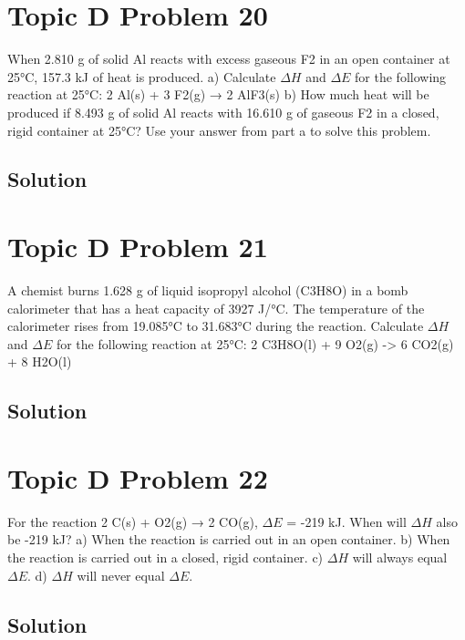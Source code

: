 \documentclass[10pt]{article}
\begin{document}
    \pagebreak
    \section{Topic D Problem 20}
        When 2.810 g of solid Al reacts with excess gaseous F2 in an open container at 25\unit{\celsius}, 157.3
kJ of heat is produced.
a) Calculate $\Delta H$ and $\Delta E$ for the following reaction at 25\unit{\celsius}:
2 Al(s) + 3 F2(g) → 2 AlF3(s)
b) How much heat will be produced if 8.493 g of solid Al reacts with 16.610 g of gaseous F2
in a closed, rigid container at 25\unit{\celsius}? Use your answer from part a to solve this problem.
        
        \subsection{Solution}

    \pagebreak
    \section{Topic D Problem 21}
        A chemist burns 1.628 g of liquid isopropyl alcohol (C3H8O) in a bomb calorimeter that has a
heat capacity of 3927 J/\unit{\celsius}. The temperature of the calorimeter rises from 19.085\unit{\celsius} to
31.683\unit{\celsius} during the reaction. Calculate $\Delta H$ and $\Delta E$ for the following reaction at 25\unit{\celsius}:
2 C3H8O(l) + 9 O2(g) -> 6 CO2(g) + 8 H2O(l)
        
        \subsection{Solution}

    \pagebreak
    \section{Topic D Problem 22}
        For the reaction 2 C(s) + O2(g) → 2 CO(g), $\Delta E$ = -219 kJ. When will $\Delta H$ also be -219 kJ?
a) When the reaction is carried out in an open container.
b) When the reaction is carried out in a closed, rigid container.
c) $\Delta H$ will always equal $\Delta E$.
d) $\Delta H$ will never equal $\Delta E$.
        
        \subsection{Solution}
\end{document}
